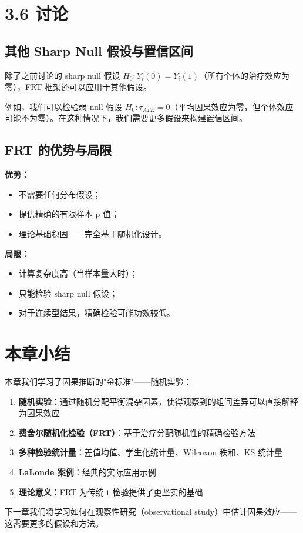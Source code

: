 \section{3.6 讨论}

\subsection{其他 Sharp Null 假设与置信区间}

除了之前讨论的 sharp null 假设 $H_0: Y_i(0) = Y_i(1)$（所有个体的治疗效应为零），FRT 框架还可以应用于其他假设。

例如，我们可以检验弱 null 假设 $H_0: \tau_{ATE} = 0$（平均因果效应为零，但个体效应可能不为零）。在这种情况下，我们需要更多假设来构建置信区间。

\subsection{FRT 的优势与局限}

\textbf{优势：}
\begin{itemize}
  \item 不需要任何分布假设；
  \item 提供精确的有限样本 p 值；
  \item 理论基础稳固——完全基于随机化设计。
\end{itemize}

\textbf{局限：}
\begin{itemize}
  \item 计算复杂度高（当样本量大时）；
  \item 只能检验 sharp null 假设；
  \item 对于连续型结果，精确检验可能功效较低。
\end{itemize}

\section{本章小结}

本章我们学习了因果推断的"金标准"——随机实验：

\begin{enumerate}
  \item \textbf{随机实验}：通过随机分配平衡混杂因素，使得观察到的组间差异可以直接解释为因果效应
  \item \textbf{费舍尔随机化检验（FRT）}：基于治疗分配随机性的精确检验方法
  \item \textbf{多种检验统计量}：差值均值、学生化统计量、Wilcoxon 秩和、KS 统计量
  \item \textbf{LaLonde 案例}：经典的实际应用示例
  \item \textbf{理论意义}：FRT 为传统 t 检验提供了更坚实的基础
\end{enumerate}

下一章我们将学习如何在观察性研究（observational study）中估计因果效应——这需要更多的假设和方法。

